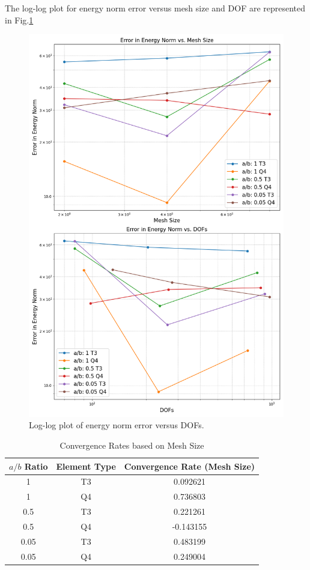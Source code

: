 \documentclass[twoside,twocolumn,10pt]{article}
\begin{document}
The log-log plot for energy norm error versus mesh size and DOF are represented in Fig.\ref{fig:logDOF_Q2_4} 
\begin{figure}[!ht]
  \centering
  \includegraphics[width=1.\linewidth]{Q2_4/log_DOFs.png}
  \caption{Log-log plot of energy norm error versus DOFs.}
  \label{fig:logDOF_Q2_4}
\end{figure}
\begin{table}[h]
  \centering
  \caption{Convergence Rates based on Mesh Size}
  \begin{tabular}{|c|c|c|}
  \hline
  \(a/b\) Ratio & Element Type & Convergence Rate (Mesh Size) \\
  \hline
  1 & T3 & 0.092621 \\
  1 & Q4 & 0.736803 \\
  0.5 & T3 & 0.221261 \\
  0.5 & Q4 & -0.143155 \\
  0.05 & T3 & 0.483199 \\
  0.05 & Q4 & 0.249004 \\
  \hline
  \end{tabular}
  \label{tab:convergenceRate_Meshsize}
\end{table}
\end{document}
